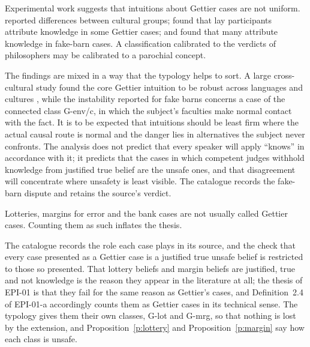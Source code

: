 \documentclass{situationist-preprint}
\begin{document}
\begin{objection}\label{o:xphi}
Experimental work suggests that intuitions about Gettier cases are not uniform. \citet{WeinbergNicholsStich2001} reported differences between cultural groups; \citet{StarmansFriedman2012} found that lay participants attribute knowledge in some Gettier cases; and \citet{Colaco2014} found that many attribute knowledge in fake-barn cases. A classification calibrated to the verdicts of philosophers may be calibrated to a parochial concept.
\end{objection}

\begin{reply}
The findings are mixed in a way that the typology helps to sort. A large cross-cultural study found the core Gettier intuition to be robust across languages and cultures \citep{Machery2017}, while the instability reported for fake barns \citep{GendlerHawthorne2005,Colaco2014} concerns a case of the connected class G-env/c, in which the subject's faculties make normal contact with the fact. It is to be expected that intuitions should be least firm where the actual causal route is normal and the danger lies in alternatives the subject never confronts. The analysis does not predict that every speaker will apply \enquote{knows} in accordance with it; it predicts that the cases in which competent judges withhold knowledge from justified true belief are the unsafe ones, and that disagreement will concentrate where unsafety is least visible. The catalogue records the fake-barn dispute and retains the source's verdict.
\end{reply}

\begin{objection}\label{o:extension}
Lotteries, margins for error and the bank cases are not usually called Gettier cases. Counting them as such inflates the thesis.
\end{objection}

\begin{reply}
The catalogue records the role each case plays in its source, and the check that every case presented as a Gettier case is a justified true unsafe belief is restricted to those so presented. That lottery beliefs and margin beliefs are justified, true and not knowledge is the reason they appear in the literature at all; the thesis of EPI-01 is that they fail for the same reason as Gettier's cases, and Definition~2.4 of EPI-01-a accordingly counts them as Gettier cases in its technical sense. The typology gives them their own classes, G-lot and G-mrg, so that nothing is lost by the extension, and Proposition~\ref{p:lottery} and Proposition~\ref{p:margin} say how each class is unsafe.
\end{reply}
\end{document}
